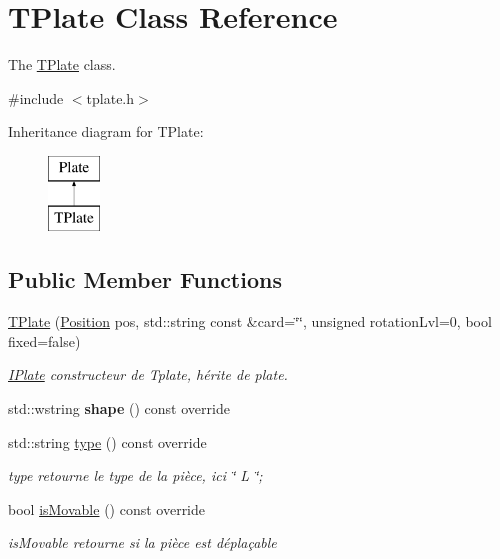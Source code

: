\hypertarget{class_t_plate}{}\section{T\+Plate Class Reference}
\label{class_t_plate}


The \mbox{\hyperlink{class_t_plate}{T\+Plate}} class.  




{\ttfamily \#include $<$tplate.\+h$>$}

Inheritance diagram for T\+Plate\+:\begin{figure}[H]
\begin{center}
\leavevmode
\includegraphics[height=2.000000cm]{class_t_plate}
\end{center}
\end{figure}
\subsection*{Public Member Functions}
\begin{DoxyCompactItemize}
\item 
\mbox{\hyperlink{class_t_plate_a7c15f87eb559671770b72b14931ea398}{T\+Plate}} (\mbox{\hyperlink{class_position}{Position}} pos, std\+::string const \&card=\char`\"{}\char`\"{}, unsigned rotation\+Lvl=0, bool fixed=false)
\begin{DoxyCompactList}\small\item\em \mbox{\hyperlink{class_i_plate}{I\+Plate}} constructeur de Tplate, hérite de plate. \end{DoxyCompactList}\item 
\mbox{\label{class_t_plate_acea9504c8d1a2874ed92f6e588177a84}} 
std\+::wstring {\bfseries shape} () const override
\item 
std\+::string \mbox{\hyperlink{class_t_plate_a321915f8a44ec086cca992c543b0bfc9}{type}} () const override
\begin{DoxyCompactList}\small\item\em type retourne le type de la pièce, ici \char`\"{} L \char`\"{}; \end{DoxyCompactList}\item 
bool \mbox{\hyperlink{class_t_plate_acaf65b2b9749bc78cfc9e2d2af4ea6b8}{is\+Movable}} () const override
\begin{DoxyCompactList}\small\item\em is\+Movable retourne si la pièce est déplaçable \end{DoxyCompactList}\end{DoxyCompactItemize}
